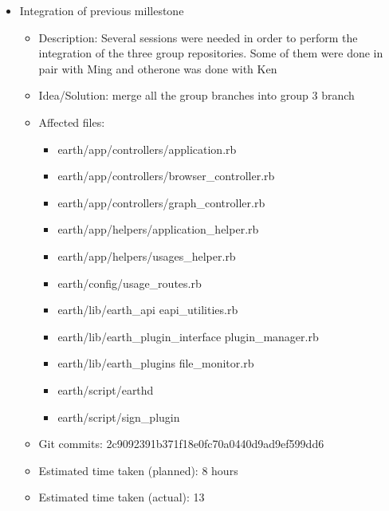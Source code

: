 \documentclass{article}
\begin{document}
\begin{itemize}
\begin{itemize}
	     \end{itemize}
	\item Integration of previous millestone
	     \begin{itemize}
	        \item Description: Several sessions were needed in order to perform the integration of the three group repositories.  Some of them were done in pair with Ming and otherone was done with Ken
		\item Idea/Solution: merge all the group branches into group 3 branch
		\item Affected files: \begin{itemize}
                                       \item earth/app/controllers/application.rb
                                       \item earth/app/controllers/browser\_controller.rb
                                       \item earth/app/controllers/graph\_controller.rb
                                       \item earth/app/helpers/application\_helper.rb
                                       \item earth/app/helpers/usages\_helper.rb
                                       \item earth/config/usage\_routes.rb
                                       \item earth/lib/earth\_api eapi\_utilities.rb
                                       \item earth/lib/earth\_plugin\_interface plugin\_manager.rb
                                       \item earth/lib/earth\_plugins file\_monitor.rb
                                       \item earth/script/earthd
                                       \item earth/script/sign\_plugin
                                      \end{itemize}
		\item Git commits: 2c9092391b371f18e0fc70a0440d9ad9ef599dd6
		\item Estimated time taken (planned): 8 hours
		\item Estimated time taken (actual): 13
	      \end{itemize}
       

\end{itemize}
\end{document}
